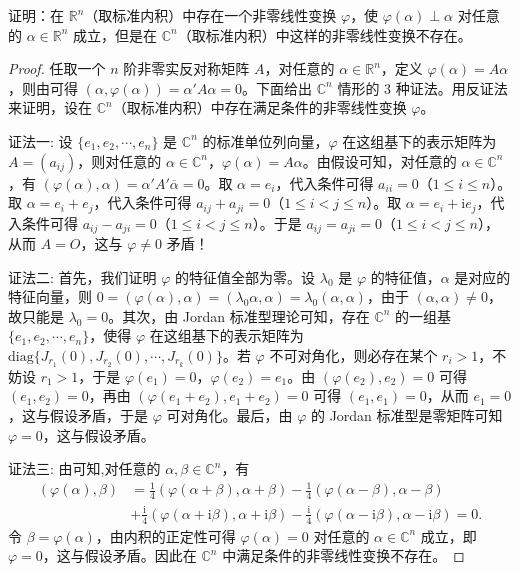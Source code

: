 \documentclass[../../main.tex]{subfiles}%
\begin{document}
\begin{proposition}\label{proposition:例9.10}
证明：在 $\mathbb{R}^n$（取标准内积）中存在一个非零线性变换 $\varphi$，使 $\varphi(\alpha)\perp\alpha$ 对任意的 $\alpha\in\mathbb{R}^n$ 成立，但是在 $\mathbb{C}^n$（取标准内积）中这样的非零线性变换不存在。
\end{proposition}
\begin{proof}

任取一个 $n$ 阶非零实反对称矩阵 $A$，对任意的 $\alpha\in\mathbb{R}^n$，定义 $\varphi(\alpha)=A\alpha$，则由可得 $(\alpha,\varphi(\alpha))=\alpha'A\alpha = 0$。下面给出 $\mathbb{C}^n$ 情形的 3 种证法。用反证法来证明，设在 $\mathbb{C}^n$（取标准内积）中存在满足条件的非零线性变换 $\varphi$。

{\color{blue}证法一:}
设 $\{e_1,e_2,\cdots,e_n\}$ 是 $\mathbb{C}^n$ 的标准单位列向量，$\varphi$ 在这组基下的表示矩阵为 $A=(a_{ij})$，则对任意的 $\alpha\in\mathbb{C}^n$，$\varphi(\alpha)=A\alpha$。由假设可知，对任意的 $\alpha\in\mathbb{C}^n$，有 $(\varphi(\alpha),\alpha)=\alpha'A'\overline{\alpha}=0$。取 $\alpha = e_i$，代入条件可得 $a_{ii}=0$（$1\leqslant  i\leqslant  n$）。取 $\alpha = e_i + e_j$，代入条件可得 $a_{ij}+a_{ji}=0$（$1\leqslant  i<j\leqslant  n$）。取 $\alpha = e_i + \mathrm{i}e_j$，代入条件可得 $a_{ij}-a_{ji}=0$（$1\leqslant  i<j\leqslant  n$）。于是 $a_{ij}=a_{ji}=0$（$1\leqslant  i<j\leqslant  n$），从而 $A = O$，这与 $\varphi\neq0$ 矛盾！

{\color{blue}证法二:}
首先，我们证明 $\varphi$ 的特征值全部为零。设 $\lambda_0$ 是 $\varphi$ 的特征值，$\alpha$ 是对应的特征向量，则 $0 = (\varphi(\alpha),\alpha)=(\lambda_0\alpha,\alpha)=\lambda_0(\alpha,\alpha)$，由于 $(\alpha,\alpha)\neq0$，故只能是 $\lambda_0 = 0$。其次，由 Jordan 标准型理论可知，存在 $\mathbb{C}^n$ 的一组基 $\{e_1,e_2,\cdots,e_n\}$，使得 $\varphi$ 在这组基下的表示矩阵为 $\mathrm{diag}\{J_{r_1}(0),J_{r_2}(0),\cdots,J_{r_k}(0)\}$。若 $\varphi$ 不可对角化，则必存在某个 $r_i>1$，不妨设 $r_1>1$，于是 $\varphi(e_1)=0$，$\varphi(e_2)=e_1$。由 $(\varphi(e_2),e_2)=0$ 可得 $(e_1,e_2)=0$，再由 $(\varphi(e_1 + e_2),e_1 + e_2)=0$ 可得 $(e_1,e_1)=0$，从而 $e_1 = 0$，这与假设矛盾，于是 $\varphi$ 可对角化。最后，由 $\varphi$ 的 Jordan 标准型是零矩阵可知 $\varphi = 0$，这与假设矛盾。

{\color{blue}证法三:}
由可知,对任意的 $\alpha,\beta\in\mathbb{C}^n$，有
\begin{align*}
(\varphi(\alpha),\beta)&=\frac{1}{4}(\varphi(\alpha + \beta),\alpha + \beta)-\frac{1}{4}(\varphi(\alpha - \beta),\alpha - \beta)\\
&+\frac{\mathrm{i}}{4}(\varphi(\alpha + \mathrm{i}\beta),\alpha + \mathrm{i}\beta)-\frac{\mathrm{i}}{4}(\varphi(\alpha - \mathrm{i}\beta),\alpha - \mathrm{i}\beta)=0.
\end{align*}
令 $\beta = \varphi(\alpha)$，由内积的正定性可得 $\varphi(\alpha)=0$ 对任意的 $\alpha\in\mathbb{C}^n$ 成立，即 $\varphi = 0$，这与假设矛盾。因此在 $\mathbb{C}^n$ 中满足条件的非零线性变换不存在。

\end{proof}
\end{document}
